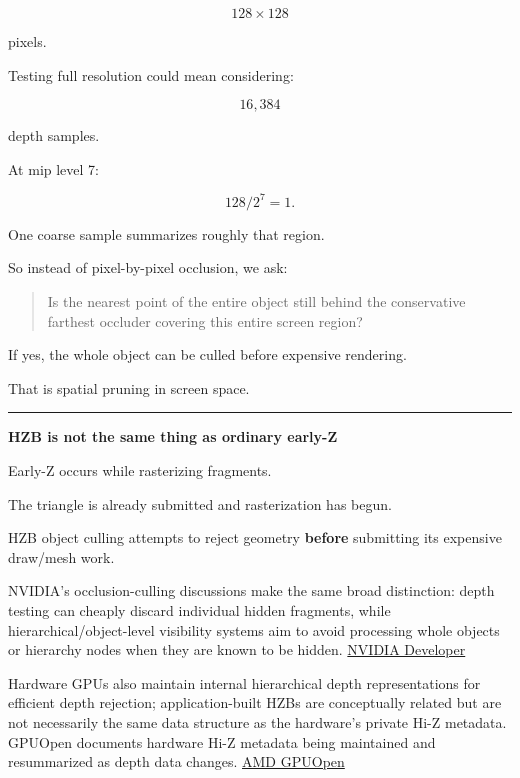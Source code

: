 \[
128\times128
\]

pixels.

Testing full resolution could mean considering:

\[
16,384
\]

depth samples.

At mip level 7:

\[
128/2^7=1.
\]

One coarse sample summarizes roughly that region.

So instead of pixel-by-pixel occlusion, we ask:

\begin{quote}
Is the nearest point of the entire object still behind the conservative farthest occluder covering this entire screen region?
\end{quote}

If yes, the whole object can be culled before expensive rendering.

That is spatial pruning in screen space.

\begin{center}\rule{0.5\linewidth}{0.5pt}\end{center}

\textbf{HZB is not the same thing as ordinary early-Z}

Early-Z occurs while rasterizing fragments.

The triangle is already submitted and rasterization has begun.

HZB object culling attempts to reject geometry \textbf{before} submitting its expensive draw/mesh work.

NVIDIA's occlusion-culling discussions make the same broad distinction: depth testing can cheaply discard individual hidden fragments, while hierarchical/object-level visibility systems aim to avoid processing whole objects or hierarchy nodes when they are known to be hidden. \href{https://developer.nvidia.com/gpugems/gpugems/part-v-performance-and-practicalities/chapter-29-efficient-occlusion-culling?utm_source=chatgpt.com}{NVIDIA Developer}

Hardware GPUs also maintain internal hierarchical depth representations for efficient depth rejection; application-built HZBs are conceptually related but are not necessarily the same data structure as the hardware's private Hi-Z metadata. GPUOpen documents hardware Hi-Z metadata being maintained and resummarized as depth data changes. \href{https://gpuopen.com/manuals/rgp_manual/overview_windows/?utm_source=chatgpt.com}{AMD GPUOpen}

